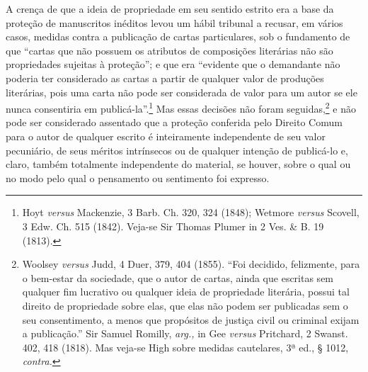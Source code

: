 A crença de que a ideia de propriedade em seu sentido estrito era a base
da proteção de manuscritos inéditos levou um hábil tribunal a recusar,
em vários casos, medidas contra a publicação de cartas particulares, sob
o fundamento de que ``cartas que não possuem os atributos de composições
literárias não são propriedades sujeitas à proteção''; e que era
``evidente que o demandante não poderia ter considerado as cartas a
partir de qualquer valor de produções literárias, pois uma carta não
pode ser considerada de valor para um autor se ele nunca consentiria em
publicá-la''.\footnote{Hoyt \emph{versus} Mackenzie, 3 Barb. Ch. 320,
  324 (1848); Wetmore \emph{versus} Scovell, 3 Edw. Ch. 515 (1842).
  Veja-se Sir Thomas Plumer in 2 Ves. \& B. 19 (1813).} Mas essas
decisões não foram seguidas,\footnote{Woolsey \emph{versus} Judd, 4
  Duer, 379, 404 (1855). ``Foi decidido, felizmente, para o bem-estar da
  sociedade, que o autor de cartas, ainda que escritas sem qualquer fim
  lucrativo ou qualquer ideia de propriedade literária, possui tal
  direito de propriedade sobre elas, que elas não podem ser publicadas
  sem o seu consentimento, a menos que propósitos de justiça civil ou
  criminal exijam a publicação.'' Sir Samuel Romilly, \emph{arg.,} in
  Gee \emph{versus} Pritchard, 2 Swanst. 402, 418 (1818). Mas veja-se
  High sobre medidas cautelares, 3ª ed., § 1012, \emph{contra.}} e não
pode ser considerado assentado que a proteção conferida pelo Direito
Comum para o autor de qualquer escrito é inteiramente independente de
seu valor pecuniário, de seus méritos intrínsecos ou de qualquer
intenção de publicá-lo e, claro, também totalmente independente do
material, se houver, sobre o qual ou no modo pelo qual o pensamento ou
sentimento foi expresso.

